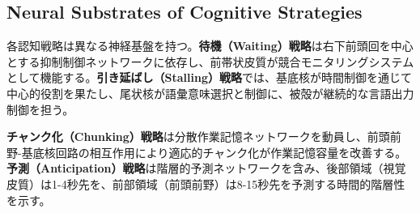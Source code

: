\subsection{Neural Substrates of Cognitive Strategies}

各認知戦略は異なる神経基盤を持つ。\textbf{待機（Waiting）戦略}は右下前頭回を中心とする抑制制御ネットワークに依存し、前帯状皮質が競合モニタリングシステムとして機能する。\textbf{引き延ばし（Stalling）戦略}では、基底核が時間制御を通じて中心的役割を果たし、尾状核が語彙意味選択と制御に、被殻が継続的な言語出力制御を担う。

\textbf{チャンク化（Chunking）戦略}は分散作業記憶ネットワークを動員し、前頭前野-基底核回路の相互作用により適応的チャンク化が作業記憶容量を改善する。\textbf{予測（Anticipation）戦略}は階層的予測ネットワークを含み、後部領域（視覚皮質）は1-4秒先を、前部領域（前頭前野）は8-15秒先を予測する時間的階層性を示す。 
